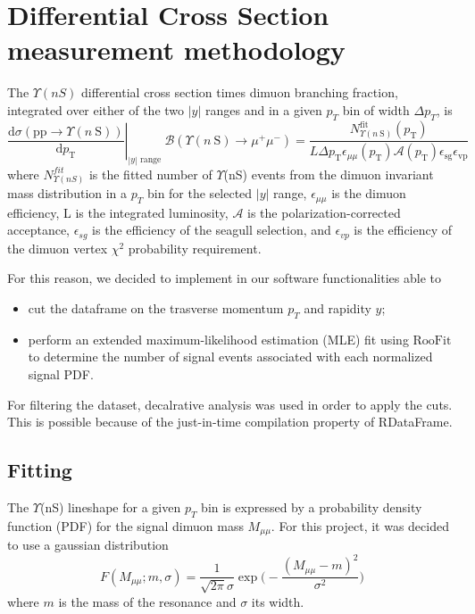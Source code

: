 \documentclass[a4paper,11pt]{article}
\begin{document}
\section{Differential Cross Section measurement methodology}
The $\Upsilon(nS)$ differential cross section times dimuon branching fraction, integrated over either of the two $|y|$ ranges and in a given $p_T$ bin of width $\Delta p_T$, is
\begin{equation}
\left.\frac{\mathrm{d} \sigma(\mathrm{pp} \rightarrow \Upsilon(n \mathrm{~S}))}{\mathrm{d} p_{\mathrm{T}}}\right|_{|y| \text { range }} \mathcal{B}\left(\Upsilon(n \mathrm{~S}) \rightarrow \mu^{+} \mu^{-}\right)=\frac{N_{\Upsilon(n \mathrm{~S})}^{\mathrm{fit}}\left(p_{\mathrm{T}}\right)}{L \Delta p_{\mathrm{T}} \epsilon_{\mu \mu}\left(p_{\mathrm{T}}\right) \mathcal{A}\left(p_{\mathrm{T}}\right) \epsilon_{\mathrm{sg}} \epsilon_{\mathrm{vp}}}\end{equation} 
where $N^{fit}_{\Upsilon(nS)}$ is the fitted number of $\Upsilon$(nS) events from the dimuon invariant mass distribution in a $p_T$ bin for the selected $|y|$ range, $\epsilon_{\mu\mu}$ is the dimuon efficiency, L is the integrated luminosity, $\mathcal{A}$ is the polarization-corrected acceptance, $\epsilon_{sg}$ is the efficiency of the seagull selection, and $\epsilon_{vp}$ is the efficiency of the dimuon vertex $\chi ^2$ probability requirement. 

For this reason, we decided to implement in our software functionalities able to 
\begin{itemize}
    \item cut the dataframe on the trasverse momentum $p_T$ and rapidity $y$;
    \item perform an extended maximum-likelihood estimation (MLE) fit using $\text{RooFit}$ to determine the number of signal events associated with each normalized signal PDF. 
\end{itemize} 

For filtering the dataset, decalrative analysis was used in order to apply the cuts. This is possible because of the just-in-time compilation property of RDataFrame.

\subsection{Fitting}
The $\Upsilon$(nS) lineshape for a given $p_T$ bin is expressed by a probability density function (PDF) for the signal dimuon mass $M_{\mu\mu}$. For this project, it was decided to use a gaussian distribution
\begin{equation}
    F(M_{\mu\mu};m,\sigma)=\frac{1}{\sqrt{2\pi} \sigma} \exp\biggl(-\frac{(M_{\mu\mu}-m)^2}{\sigma^2}\biggr)
\end{equation}
where $m$ is the mass of the resonance and $\sigma$ its width.
\end{document}
